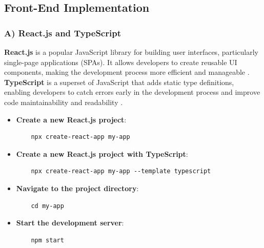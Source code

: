 \subsection{Front-End Implementation}
\subsubsection{A) React.js and TypeScript}

\textbf{React.js} is a popular JavaScript library for building user interfaces, particularly single-page applications (SPAs). It allows developers to create reusable UI components, making the development process more efficient and manageable \cite{reactjs}. 
\newpage
\textbf{TypeScript} is a superset of JavaScript that adds static type definitions, enabling developers to catch errors early in the development process and improve code maintainability and readability \cite{reactTS}.


\begin{itemize}
    \item \textbf{Create a new React.js project}:
    \begin{verbatim}
    npx create-react-app my-app
    \end{verbatim}

    \vspace{-4.5mm}
    
    \item \textbf{Create a new React.js project with TypeScript}:
    \begin{verbatim}
    npx create-react-app my-app --template typescript
    \end{verbatim}

    \vspace{-4.5mm}
    
    \item \textbf{Navigate to the project directory}:
    \begin{verbatim}
    cd my-app
    \end{verbatim}
    
    \vspace{-4.5mm}
    
    \item \textbf{Start the development server}:
    \begin{verbatim}
    npm start
    \end{verbatim}
\end{itemize}

\vspace{-10mm}

